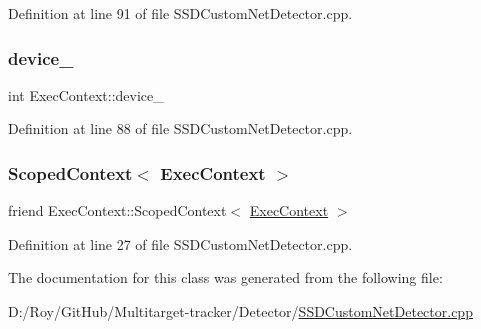 Definition at line 91 of file S\+S\+D\+Custom\+Net\+Detector.\+cpp.

\mbox{\label{class_exec_context_a05d01fbf5236f59519a9708580c175da}} 
\subsubsection{\texorpdfstring{device\+\_\+}{device\_}}
{\footnotesize\ttfamily int Exec\+Context\+::device\+\_\+\hspace{0.3cm}{\ttfamily [private]}}



Definition at line 88 of file S\+S\+D\+Custom\+Net\+Detector.\+cpp.

\mbox{\label{class_exec_context_a5d1035fff84318aecd7d6b30c34c66f5}} 
\subsubsection{\texorpdfstring{Scoped\+Context$<$ Exec\+Context $>$}{ScopedContext< ExecContext >}}
{\footnotesize\ttfamily friend Exec\+Context\+::\+Scoped\+Context$<$ \mbox{\hyperlink{class_exec_context}{Exec\+Context}} $>$}



Definition at line 27 of file S\+S\+D\+Custom\+Net\+Detector.\+cpp.



The documentation for this class was generated from the following file\+:\begin{DoxyCompactItemize}
\item 
D\+:/\+Roy/\+Git\+Hub/\+Multitarget-\/tracker/\+Detector/\mbox{\hyperlink{_s_s_d_custom_net_detector_8cpp}{S\+S\+D\+Custom\+Net\+Detector.\+cpp}}\end{DoxyCompactItemize}

